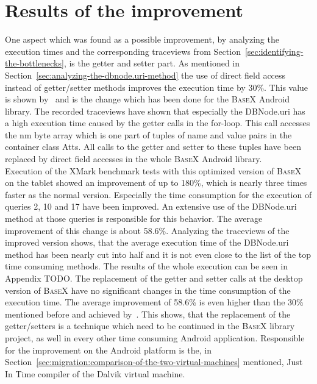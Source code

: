 \section{Results of the improvement}
\label{sec:improving}
One aspect which was found as a possible improvement, by analyzing the execution times and the corresponding traceviews from Section~\ref{sec:identifying-the-bottlenecks}, is the getter and setter part.
As mentioned in Section~\ref{sec:analyzing-the-dbnode.uri-method} the use of direct field access instead of getter/setter methods improves the execution time by 30\%.
This value is shown by~\cite{toninievlautatingandroid} and is the change which has been done for the \textsc{BaseX} Android library.
The recorded traceviews have shown that especially the \textsf{DBNode.uri} has a high execution time caused by the getter calls in the for-loop.
This call accesses the \textsf{nm} byte array which is one part of tuples of name and value pairs in the container class \textsf{Atts}.
All calls to the getter and setter to these tuples have been replaced by direct field accesses in the whole \textsc{BaseX} Android library.\\
Execution of the XMark benchmark tests with this optimized version of \textsc{BaseX} on the tablet showed an improvement of up to 180\%, which is nearly three times faster as the normal version.
Especially the time consumption for the execution of queries 2, 10 and 17 have been improved.
An extensive use of the \textsf{DBNode.uri} method at those queries is responsible for this behavior.
The average improvement of this change is about 58.6\%.
Analyzing the traceviews of the improved version shows, that the average execution time of the \textsf{DBNode.uri} method has been nearly cut into half and it is not even close to the list of the top time consuming methods.
The results of the whole execution can be seen in Appendix TODO.
The replacement of the getter and setter calls at the desktop version of \textsc{BaseX} have no significant changes in the time consumption of the execution time.
The average improvement of 58.6\% is even higher than the 30\% mentioned before and achieved by~\cite{toninievlautatingandroid}.
This shows, that the replacement of the getter/setters is a technique which need to be continued in the \textsc{BaseX} library project, as well in every other time consuming Android application.
Responsible for the improvement on the Android platform is the, in Section~\ref{sec:migration:comparison-of-the-two-virtual-machines} mentioned, Just In Time compiler of the Dalvik virtual machine. 
